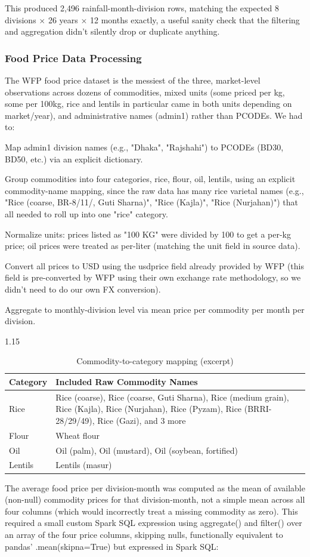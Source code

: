 \documentclass[12pt,a4paper]{article}
\begin{document}
This produced 2,496 rainfall-month-division rows, matching the expected 8 divisions $\times$ 26 years $\times$ 12 months exactly, a useful sanity check that the filtering and aggregation didn't silently drop or duplicate anything.


\subsubsection{Food Price Data Processing}

The WFP food price dataset is the messiest of the three, market-level observations across dozens of commodities, mixed units (some priced per kg, some per 100kg, rice and lentils in particular came in both units depending on market/year), and administrative names (admin1) rather than PCODEs. We had to:

Map admin1 division names (e.g., "Dhaka", "Rajshahi") to PCODEs (BD30, BD50, etc.) via an explicit dictionary.

Group commodities into four categories, rice, flour, oil, lentils, using an explicit commodity-name mapping, since the raw data has many rice varietal names (e.g., "Rice (coarse, BR-8/11/, Guti Sharna)", "Rice (Kajla)", "Rice (Nurjahan)") that all needed to roll up into one "rice" category.

Normalize units: prices listed as "100 KG" were divided by 100 to get a per-kg price; oil prices were treated as per-liter (matching the unit field in source data).

Convert all prices to USD using the usdprice field already provided by WFP (this field is pre-converted by WFP using their own exchange rate methodology, so we didn't need to do our own FX conversion).

Aggregate to monthly-division level via mean price per commodity per month per division.
\begin{table}[H]
\centering
\begin{spacing}{1.15}
\caption{Commodity-to-category mapping (excerpt)}
\label{tab:commodity}
\begin{tabularx}{\textwidth}{lX}
\toprule
\textbf{Category} & \textbf{Included Raw Commodity Names} \\
\midrule
Rice    & Rice (coarse), Rice (coarse, Guti Sharna), Rice (medium grain), Rice (Kajla), Rice (Nurjahan), Rice (Pyzam), Rice (BRRI-28/29/49), Rice (Gazi), and 3 more \\
Flour   & Wheat flour \\
Oil     & Oil (palm), Oil (mustard), Oil (soybean, fortified) \\
Lentils & Lentils (masur) \\
\bottomrule
\end{tabularx}
\end{spacing}
\end{table}
The average food price per division-month was computed as the mean of available (non-null) commodity prices for that division-month, not a simple mean across all four columns (which would incorrectly treat a missing commodity as zero). This required a small custom Spark SQL expression using aggregate() and filter() over an array of the four price columns, skipping nulls, functionally equivalent to pandas' .mean(skipna=True) but expressed in Spark SQL:
\end{document}
